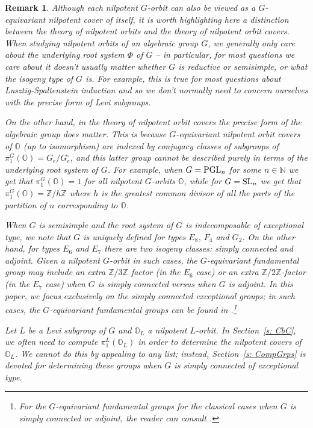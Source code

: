 \documentclass[11pt]{amsart}
\renewcommand{\O}{{\mathbb O}}
\newcommand{\bZ}{{\mathbb Z}}
\newcommand{\N}{{\mathbb N}}
\newcommand{\SL}{{{\mbox{\rm SL}}}}
\newcommand{\PGL}{{{\mbox{\rm PGL}}}}
\newtheorem{rmk}{Remark}
\numberwithin{equation}{section}
\begin{document}
	\begin{rmk}\label{rmk: orbs as covs}
		Although each nilpotent $G$-orbit can also be viewed as a $G$-equivariant nilpotent cover of itself, it is worth highlighting here a distinction between the theory of nilpotent orbits and the theory of nilpotent orbit covers. When studying nilpotent orbits of an algebraic group $G$, we generally only care about the underlying root system $\Phi$ of $G$ -- in particular, for most questions we care about it doesn't usually matter whether $G$ is reductive or semisimple, or what the isogeny type of $G$ is. For example, this is true for most questions about Lusztig-Spaltenstein induction and so we don't normally need to concern ourselves with the precise form of Levi subgroups.
		
		On the other hand, in the theory of nilpotent orbit covers the precise form of the algebraic group does matter. This is because $G$-equivariant nilpotent orbit covers of $\O$ (up to isomorphism) are indexed by conjugacy classes of subgroups of $\pi_1^G(\O)=G_e/G_e^\circ$, and this latter group cannot be described purely in terms of the underlying root system of $G$. For example, when $G=\PGL_n$ for some $n\in\N$ we get that $\pi_1^G(\O)=1$ for all nilpotent $G$-orbits $\O$, while for $G=\SL_n$ we get that $\pi_1^G(\O)=\bZ/h\bZ$ where $h$ is the greatest common divisor of all the parts of the partition of $n$ corresponding to $\O$. 
		
		When $G$ is semisimple and the root system of $G$ is indecomposable of exceptional type, we note that $G$ is uniquely defined for types $E_8$, $F_4$ and $G_2$. On the other hand, for types $E_6$ and $E_7$ there are two isogeny classes: simply connected and adjoint. Given a nilpotent $G$-orbit in such cases, the $G$-equivariant fundamental group may include an extra $\bZ/3\bZ$ factor (in the $E_6$ case) or an extra $\bZ/2\bZ$-factor (in the $E_7$ case) when $G$ is simply connected versus when $G$ is adjoint. In this paper, we focus exclusively on the simply connected exceptional groups; in such cases, the $G$-equivariant fundamental groups can be found in \cite[\S 8.4]{CM}.\footnote{For the $G$-equivariant fundamental groups for the classical cases when $G$ is simply connected or adjoint, the reader can consult \cite[Corollary 6.1.6]{CM}.}
		
		Let $L$ be a Levi subgroup of $G$ and $\O_L$ a nilpotent $L$-orbit. In Section~\ref{s: CbC}, we often need to compute $\pi_1^L(\O_L)$ in order to determine the nilpotent covers of $\O_L$. We cannot do this by appealing to any list; instead, Section~\ref{s: CompGrps} is devoted for determining these groups when $G$ is simply connected of exceptional type.
	\end{rmk}
	
\end{document}
